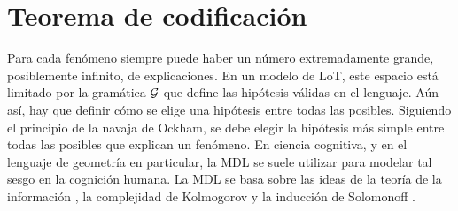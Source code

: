 \section{Teorema de codificación}
\label{sec:coding}


Para cada fenómeno siempre puede haber un número extremadamente grande, posiblemente infinito, de explicaciones. En un modelo de LoT, este espacio está limitado por la gramática $\gram$ que define las hipótesis válidas en el lenguaje. Aún así, hay que definir cómo se elige una hipótesis entre todas las posibles. Siguiendo el principio de la navaja de Ockham, se debe elegir la hipótesis más simple entre todas las posibles que explican un fenómeno. En ciencia cognitiva, y en el lenguaje de geometría en particular, la MDL se suele utilizar para modelar tal sesgo en la cognición humana. La MDL se basa sobre las ideas de la teoría de la información \cite{shannon48}, la complejidad de Kolmogorov \cite{kolmogorov1968three} y la inducción de Solomonoff \cite{solomonoff1964formal}.


